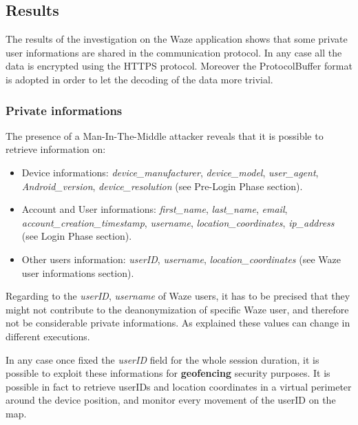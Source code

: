 	\subsection{Results}
		\par The results of the investigation on the Waze application shows that some private user informations are shared in the communication protocol. In any case all the data is encrypted using the HTTPS protocol. Moreover the ProtocolBuffer format is adopted in order to let the decoding of the data more trivial. 
	\subsubsection{Private informations}
	\par The presence of a Man-In-The-Middle attacker reveals that it is possible to retrieve information on:
		\begin{itemize}
			\item Device informations: \textit{device\_manufacturer}, \textit{device\_model}, \textit{user\_agent}, \textit{Android\_version}, \textit{device\_resolution} (see Pre-Login Phase section). 
			\item Account and User informations: \textit{first\_name}, \textit{last\_name}, \textit{email}, \textit{account\_creation\_timestamp}, \textit{username}, \textit{location\_coordinates}, \textit{ip\_address} (see Login Phase section).     
			\item Other users information: \textit{userID}, \textit{username}, \textit{location\_coordinates} (see Waze user informations section).
		\end{itemize}
		Regarding to the \textit{userID}, \textit{username} of Waze users, it has to be precised that they might not contribute to the deanonymization of specific Waze user, and therefore not be considerable private informations. As explained these values can change in different executions.\newline
		\par In any case once fixed the \textit{userID} field for the whole session duration, it is possible to exploit these informations for \textbf{geofencing} security purposes. It is possible in fact to retrieve userIDs and location coordinates in a virtual perimeter around the device position, and monitor every movement of the userID on the map.
	
